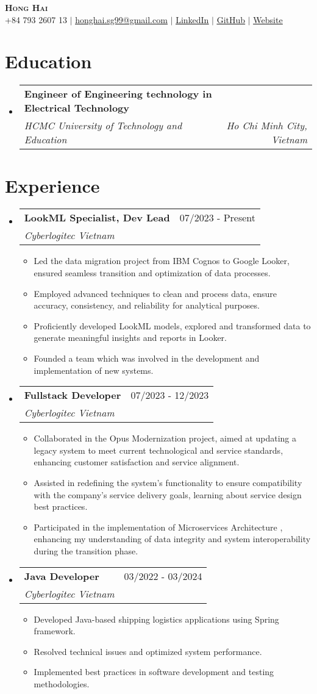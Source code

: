 \documentclass[letterpaper,11pt]{article}
\makeatletter
\newcommand{\resumeItem}[1]{
  \item\small{
    {#1 \vspace{-2pt}}
  }
}
\newcommand{\resumeSubheading}[4]{
  \vspace{-2pt}\item
    \begin{tabular*}{0.97\textwidth}[t]{l@{\extracolsep{\fill}}r}
      \textbf{#1} & #2 \\
      \textit{\small#3} & \textit{\small #4} \\
    \end{tabular*}\vspace{-7pt}
}
\newcommand{\resumeSubHeadingListStart}{\begin{itemize}[leftmargin=0.15in, label={}]}
\newcommand{\resumeSubHeadingListEnd}{\end{itemize}}
\newcommand{\resumeItemListStart}{\begin{itemize}}
\newcommand{\resumeItemListEnd}{\end{itemize}\vspace{-5pt}}
\makeatother
\begin{document}
\begin{center}
    \textbf{\Huge \scshape Hong Hai} \\ \vspace{1pt}
    \small +84 793 2607 13 $|$ \href{mailto:honghai.sg99@gmail.com}{\underline{honghai.sg99@gmail.com}} $|$ \href{https://linkedin.com/in/honghaisg/}{\underline{LinkedIn}} $|$ \href{https://github.com/honghaine}{\underline{GitHub}} $|$ \href{https://honghaine.com}{\underline{Website}}
\end{center}

\section{Education}
  \resumeSubHeadingListStart
    \resumeSubheading
      {Engineer of Engineering technology in Electrical Technology}{}
      {HCMC University of Technology and Education}{Ho Chi Minh City, Vietnam}
  \resumeSubHeadingListEnd

\section{Experience}
  \resumeSubHeadingListStart
    \resumeSubheading
      {LookML Specialist, Dev Lead}{07/2023 - Present}
      {Cyberlogitec Vietnam}{}
      \resumeItemListStart
        \resumeItem{Led the data migration project from IBM Cognos to Google Looker, ensured seamless transition and optimization of data processes.}
        \resumeItem{Employed advanced techniques to clean and process data, ensure accuracy, consistency, and reliability for analytical purposes.}
        \resumeItem{Proficiently developed LookML models, explored and transformed data to generate meaningful insights and reports in Looker.}
        \resumeItem{Founded a team which was involved in the development and implementation of new systems.}
      \resumeItemListEnd
    \resumeSubheading
      {Fullstack Developer}{07/2023 - 12/2023}
      {Cyberlogitec Vietnam}{}
      \resumeItemListStart
        \resumeItem{Collaborated in the Opus Modernization project, aimed at updating a legacy system to meet current technological and service standards, enhancing customer satisfaction and service alignment.}
        \resumeItem{Assisted in redefining the system's functionality to ensure compatibility with the company's service delivery goals, learning about service design best practices.}
        \resumeItem{Participated in the implementation of Microservices Architecture , enhancing my understanding of data integrity and system interoperability during the transition phase.}
      \resumeItemListEnd
    \resumeSubheading
      {Java Developer}{03/2022 - 03/2024}
      {Cyberlogitec Vietnam}{}
      \resumeItemListStart
        \resumeItem{Developed Java-based shipping logistics applications using Spring framework.}
        \resumeItem{Resolved technical issues and optimized system performance.}
        \resumeItem{Implemented best practices in software development and testing methodologies.}
      \resumeItemListEnd
  \resumeSubHeadingListEnd
\end{document}
